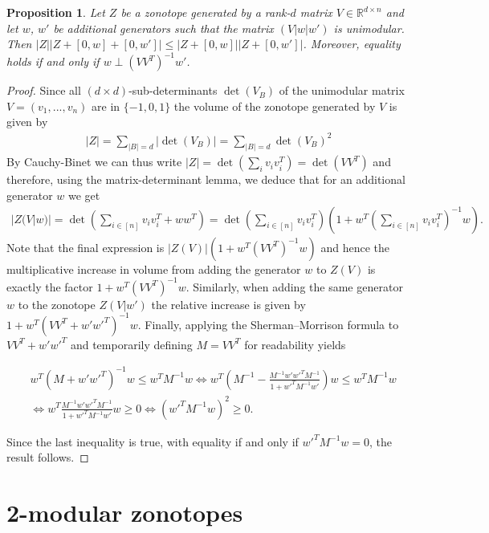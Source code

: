 \documentclass{article}
\newcommand{\R}{\mathbb{R}}
\theoremstyle{theorem}
\newtheorem{proposition}[theorem]{Proposition}
\theoremstyle{remark}
\begin{document}
\begin{proposition} \label{prop:unimodular_zonos}
    Let $Z$ be a zonotope generated by a rank-$d$ matrix $V \in \R^{d \times n}$ and let $w$, $w'$ be additional generators such that the matrix $(V|w|w')$ is unimodular. Then $|Z||Z+[0,w]+[0,w']| \leq |Z+[0,w]||Z+[0,w']|$. Moreover, equality holds if and only if $w\perp (VV^T)^{-1}w'$.
\end{proposition}

\begin{proof}
    Since all $(d\times d)$-sub-determinants $\det(V_B)$ of the unimodular matrix $V=(v_1,...,v_n)$ are in $\{-1,0,1\}$ the volume of the zonotope generated by $V$ is given by 
    \begin{align*}
        |Z| = \sum_{|B|=d} | \det(V_B)|  =  \sum_{|B|=d}\det(V_B)^2
    \end{align*} 
    By Cauchy-Binet we can thus write $|Z| = \det({\sum_i v_iv_i^T}) = \det(VV^T)$ and therefore, using the matrix-determinant lemma, we deduce that for an additional generator $w$ we get
    \begin{align*}
        |Z(V|w)|= \det\left( \sum_{i \in [n]}v_i v_i^T + ww^T \right) = \det\left( \sum_{i \in [n]}v_i v_i^T\right) \left(1 + w^T \left(\sum_{i \in [n]}v_i v_i^T\right)^{-1} w  \right).
    \end{align*}
    Note that the final expression is $ |Z(V)|(1+w^T(VV^T)^{-1}w)$ and hence the multiplicative increase in volume from adding the generator $w$ to $Z(V)$ is exactly the factor $1+w^T(VV^T)^{-1}w$. Similarly, when adding the same generator $w$ to the zonotope $Z(V|w')$ the relative increase is given by $1 + w^T(VV^T + w'w'^T)^{-1}w$. Finally, applying the Sherman–Morrison formula to $VV^T + w'w'^T$ and temporarily defining $M = VV^T$ for readability yields
    
    \begin{align*}
        &w^T(M + w'w'^T)^{-1}w \leq w^TM^{-1}w  \iff w^T\left(M^{-1}- \frac{M^{-1}w'w'^TM^{-1}}{1 + w'^TM^{-1}w'}\right)w \leq w^TM^{-1}w\\
        &\iff w^T\frac{M^{-1}w'w'^TM^{-1}}{1 + w'^TM^{-1}w'}w \geq 0 \iff (w'^TM^{-1}w)^2 \geq 0.
    \end{align*}

    Since the last inequality is true, with equality if and only if $w'^TM^{-1}w = 0$, the result follows.
\end{proof}

\section{2-modular zonotopes}
\end{document}

